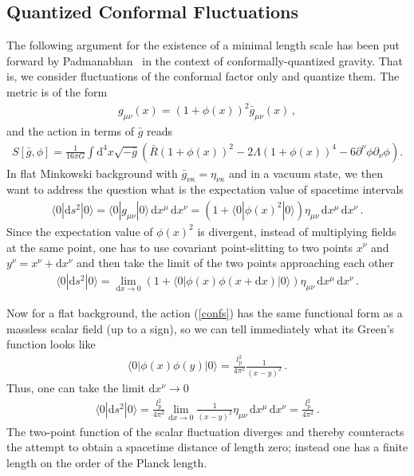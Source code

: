 \documentclass{article}
\def\beqn{\begin{eqnarray}}
\def\eeqn{\end{eqnarray}}
\begin{document}
\subsection{Quantized Conformal Fluctuations}
\label{conformalqg}

The following argument for the existence of a minimal length scale has been put forward by 
Padmanabhan~\cite{Padmanabhan:1985jq, Padmanabhan:1986ny} in the context of conformally-quantized
gravity. That is, we consider fluctuations of the conformal factor only and quantize them. The metric
is of the form
\beqn
g_{\mu\nu}(x) = (1 + \phi(x))^2 \bar g_{\mu\nu}(x) \,,
\eeqn
and the action in terms of $\bar g$ reads
\beqn
S[\bar g, \phi] = \frac{1}{16 \pi G} \int \mathrm{d}^4 x \sqrt{-\bar g} \left( \bar R(1+\phi(x))^2 - 2 \Lambda (1 + \phi(x))^4 - 6 \partial^\nu \phi \partial_\nu \phi \right) . \label{confs}
\eeqn
In flat Minkowski background with $\bar g_{\nu \kappa} = \eta_{\nu \kappa}$ and in a vacuum state, we then want to address the
question what  is the expectation value of spacetime intervals
\beqn
\langle 0 | \mathrm{d}s^2 | 0 \rangle = \langle 0 | g_{\mu \nu} | 0
\rangle \, \mathrm{d}x^\mu \, \mathrm{d}x^\nu 
= (1+ \langle 0 | \phi(x)^2 | 0 \rangle ) \eta_{\mu\nu} \,
\mathrm{d}x^\mu \, \mathrm{d}x^\nu \,. 
\eeqn
Since the expectation value of $\phi(x)^2$ is divergent, instead of multiplying fields at the same point, one has to use covariant point-slitting to two points $x^\nu$ and $y^\nu = x^\nu + \mathrm{d}x^\nu$ 
and then take the limit of the two points approaching each other
\beqn
\langle 0 | \mathrm{d}s^2 | 0 \rangle = \lim_{\mathrm{d}x \to 0} (1+
\langle 0 | \phi(x)\phi(x + \mathrm{d}x) | 0 \rangle ) \eta_{\mu\nu}
\, \mathrm{d}x^\mu \, \mathrm{d}x^\nu \,.  
\eeqn

Now for a flat background, the action (\ref{confs}) has the same functional form as a massless scalar field (up to a sign), so we can tell
immediately what its Green's function looks like
\beqn
 \langle 0 | \phi(x)\phi(y) | 0 \rangle = \frac{l_{\mathrm{p}}^2}{4 \pi^2} \frac{1}{(x-y)^2} \,.
\eeqn
Thus, one can take the limit $\mathrm{d}x^\nu \to 0$ 
\beqn
\langle 0 | \mathrm{d}s^2 | 0 \rangle = \frac{l_{\mathrm{p}}^2}{4
  \pi^2}  \lim_{\mathrm{d}x \to 0} \frac{1}{(x-y)^2} \eta_{\mu\nu} \,
\mathrm{d}x^\mu \, \mathrm{d}x^\nu = \frac{l_{\mathrm{p}}^2}{4 \pi^2}
\,.  \label{conflimit}
\eeqn
The two-point function of the scalar fluctuation diverges and thereby counteracts the attempt to obtain a spacetime distance of length
zero; instead one has a finite length on the order of the Planck length.
\end{document}
